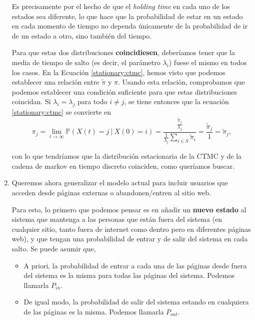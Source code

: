 \documentclass[a4paper]{article}
\begin{document}
\begin{enumerate}[label=(\alph*)]
        Es precisamente por el hecho de que el \emph{holding time} en cada uno de los estados sea diferente, lo que hace que la probabilidad de estar en un estado en cada momento de tiempo no dependa únicamente de la probabilidad de ir de un estado a otro, sino también del tiempo.

        Para que estas dos distribuciones \textbf{coincidiesen}, deberíamos tener que la media de tiempo de salto (es decir, el parámetro $\lambda_{i}$) fuese el mismo en todos los casos. En la Ecuación \eqref{stationary:ctmc}, hemos visto que podemos establecer una relación entre $\tilde \pi$ y $\pi$. Usando esta relación, comprobamos que podemos establecer una condición suficiente para que estas distribuciones coincidan. Si $\lambda_{i} = \lambda_{j}$ para todo $i \neq j$, se tiene entonces que la ecuación \eqref{stationary:ctmc} se convierte en
        \[
        \pi_{j} = \lim_{t \to \infty} \mathbb P(X(t) = j \ | \ X(0) = i) = \frac{ \frac{\tilde \pi_{j}}{\lambda_{j}}}{\frac{1}{\lambda_{j}} \sum_{i \in S}\tilde \pi_{i}} = \frac{\tilde \pi_{j}}{1} = \tilde \pi_{j},
        \]

        con lo que tendríamos que la distribución estacionaria de la CTMC y de la cadena de markov en tiempo discreto coinciden, como queríamos buscar.


  \item Queremos ahora generalizar el modelo actual para incluir usuarios que acceden desde páginas externas o abandonen/entren al sitio web.

        Para esto, lo primero que podemos pensar es en añadir un \textbf{nuevo estado} al sistema que mantenga a las personas que están fuera del sistema (en cualquier sitio, tanto fuera de internet como dentro pero en diferentes páginas web), y que tengan una probabilidad de entrar y de salir del sistema en cada salto. Se puede asumir que,

        \begin{itemize}
          \item A priori, la probabilidad de entrar a cada una de las páginas desde fuera del sistema es la misma para todas las páginas del sistema. Podemos llamarla $P_{in}$.
                \item De igual modo, la probabilidad de salir del sistema estando en cualquiera de las páginas es la misma. Podemos llamarla $P_{out}$.
        \end{itemize}


\end{enumerate}
\end{document}
